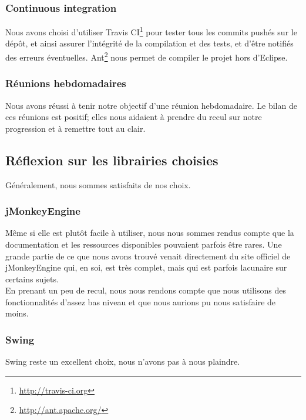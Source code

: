 	\subsubsection{Continuous integration}
	Nous avons choisi d'utiliser Travis CI\footnote{\url{http://travis-ci.org}}
	pour tester tous les commits pushés sur le dépôt, et ainsi assurer
	l'intégrité de la compilation et des tests, et d'être notifiés des erreurs
	éventuelles. Ant\footnote{\url{http://ant.apache.org/}} nous permet de
	compiler le projet hors d'Eclipse.

	\subsubsection{Réunions hebdomadaires}
	Nous avons réussi à tenir notre objectif d'une réunion hebdomadaire. Le 
	bilan de ces réunions est positif; elles nous aidaient à prendre du 
	recul sur notre progression et à remettre tout au clair. 

\subsection{Réflexion sur les librairies choisies}

	Généralement, nous sommes satisfaits de nos choix.

	\subsubsection{jMonkeyEngine}
	Même si elle est plutôt facile à utiliser, nous nous sommes rendus compte
	que la documentation et les ressources disponibles pouvaient parfois être
	rares. Une grande partie de ce que nous avons trouvé venait directement 
	du site officiel de jMonkeyEngine qui, en soi, est très complet, mais qui
	est parfois lacunaire sur certains sujets.\\

	En prenant un peu de recul, nous nous rendons compte que nous utilisons
	des fonctionnalités d'assez bas niveau et que nous aurions pu nous 
	satisfaire de moins.

	\subsubsection{Swing}
	Swing reste un excellent choix, nous n'avons pas à nous plaindre.